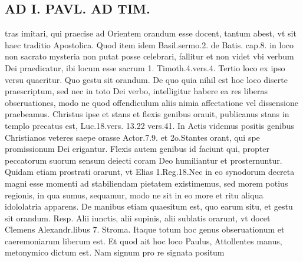 \documentclass{article}
\begin{document}
\begin{pages}
\section*{AD I. PAVL. AD TIM. }
\marginpar{[ p.74 ]}\pstart tras imitari, qui praecise ad Orientem orandum esse docent, tantum abest, vt sit haec traditio Apostolica. Quod item idem Basil.sermo.2. de Batis. cap.8. in loco non sacrato mysteria non putat posse celebrari, fallitur et non videt vbi verbum Dei praedicatur, ibi locum esse sacrum 1. Timoth.4.vers.4.  \pend\pstart Tertio loco ex ipso versu quaeritur. Quo gestu sit orandum. De quo quia nihil est hoc loco diserte praescriptum, sed nec in toto Dei verbo, intelligitur habere ea res liberas obseruationes, modo ne quod offendiculum aliis nimia affectatione vel dissensione praebeamus. Christus ipse et stans et flexis genibus orauit, publicanus stans in templo precatus est, Luc.18.vers. 13.22 vers.41. In Actis videmus positis genibus Christianos veteres saepe orasse Actor.7.9. et 2o.Stantes orant, qui spe promissionum Dei erigantur. Flexis autem genibus id faciunt qui, propter peccatorum suorum sensum deiecti coram Deo humiliantur et prosternuntur. Quidam etiam prostrati orarunt, vt Elias 1.Reg.18.Nec in eo synodorum decreta magni esse momenti ad stabiliendam pietatem existimemus, sed morem potius regionis, in qua sumus, sequamur, modo ne sit in eo more et ritu aliqua idololatria apparens. De manibus etiam quaesitum est, quo earum situ, et gestu sit orandum. Resp. Alii iunctis, alii supinis, alii sublatis orarunt, vt docet Clemens Alexandr.libus 7. Stroma. Itaque totum hoc genus obseruationum et caeremoniarum liberum est. Et quod ait hoc loco Paulus, Attollentes manus, metonymico dictum est. Nam signum pro re signata positum  \pend

\end{pages}
\end{document}
